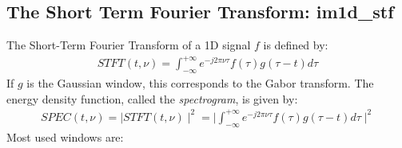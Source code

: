 \subsection{The Short Term Fourier Transform: im1d\_stf}
The Short-Term Fourier Transform of a 1D signal $f$ is defined by:
\begin{eqnarray}
STFT(t, \nu) = \int_{-\infty}^{+\infty} e^{-j2\pi\nu \tau} f(\tau)g(\tau-t) d\tau
\end{eqnarray}
If $g$ is the Gaussian window, this corresponds to the Gabor transform.
The energy density function, called the {\em spectrogram}, is given by:
\begin{eqnarray}
SPEC(t, \nu) = \mid STFT(t, \nu) \mid^2 
=  \mid  \int_{-\infty}^{+\infty} e^{-j2\pi\nu \tau} f(\tau)g(\tau-t) d\tau \mid^2 
\end{eqnarray}
Most used windows are:
